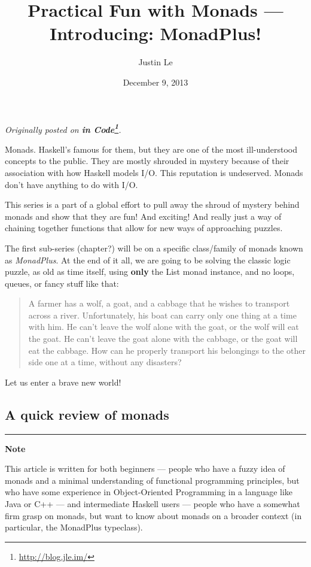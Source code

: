 \documentclass[]{article}
\title{Practical Fun with Monads --- Introducing: MonadPlus!}
\author{Justin Le}
\date{December 9, 2013}
\renewcommand{\href}[2]{#2\footnote{\url{#1}}}
\begin{document}
\maketitle

\emph{Originally posted on \textbf{\href{http://blog.jle.im/}{in
Code}}.}

Monads. Haskell's famous for them, but they are one of the most
ill-understood concepts to the public. They are mostly shrouded in
mystery because of their association with how Haskell models I/O. This
reputation is undeserved. Monads don't have anything to do with I/O.

This series is a part of a global effort to pull away the shroud of
mystery behind monads and show that they are fun! And exciting! And
really just a way of chaining together functions that allow for new ways
of approaching puzzles.

The first sub-series (chapter?) will be on a specific class/family of
monads known as \emph{MonadPlus}. At the end of it all, we are going to
be solving the classic logic puzzle, as old as time itself, using
\textbf{only} the List monad instance, and no loops, queues, or fancy
stuff like that:

\begin{quote}
A farmer has a wolf, a goat, and a cabbage that he wishes to transport
across a river. Unfortunately, his boat can carry only one thing at a
time with him. He can't leave the wolf alone with the goat, or the wolf
will eat the goat. He can't leave the goat alone with the cabbage, or
the goat will eat the cabbage. How can he properly transport his
belongings to the other side one at a time, without any disasters?
\end{quote}

Let us enter a brave new world!

\subsection{A quick review of monads}\label{a-quick-review-of-monads}

\begin{center}\rule{0.5\linewidth}{\linethickness}\end{center}

\textbf{Note}

This article is written for both beginners --- people who have a fuzzy
idea of monads and a minimal understanding of functional programming
principles, but who have some experience in Object-Oriented Programming
in a language like Java or C++ --- and intermediate Haskell users ---
people who have a somewhat firm grasp on monads, but want to know about
monads on a broader context (in particular, the MonadPlus typeclass).
\end{document}
